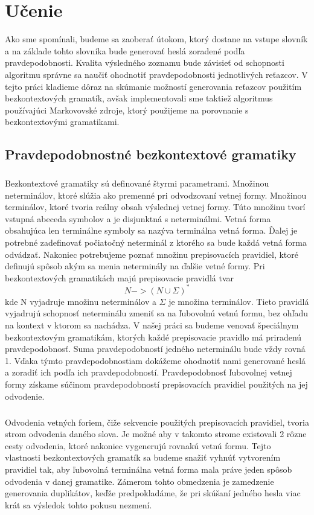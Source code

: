 \chapter{Učenie}
Ako sme spomínali, budeme sa zaoberať útokom, ktorý dostane na vstupe slovník a na základe tohto slovníka bude generovať heslá zoradené podľa pravdepodobnosti. Kvalita výsledného zoznamu bude závisieť od schopnosti algoritmu správne sa naučiť ohodnotiť pravdepodobnosti jednotlivých reťazcov. V tejto práci kladieme dôraz na skúmanie možností generovania reťazcov použitím bezkontextových gramatík, avšak implementovali sme taktiež algoritmus používajúci Markovovské zdroje, ktorý použijeme na porovnanie s bezkontextovými gramatikami.

\section{Pravdepodobnostné bezkontextové gramatiky}
\paragraph{}
Bezkontextové gramatiky sú definované štyrmi parametrami. Množinou neterminálov, ktoré slúžia ako premenné pri odvodzovaní vetnej formy. Množinou terminálov, ktoré tvoria reálny obsah výslednej vetnej formy. Túto množinu tvorí vstupná abeceda symbolov a je disjunktná s neterminálmi. Vetná forma obsahujúca len terminálne symboly sa nazýva terminálna vetná forma. Ďalej je potrebné zadefinovať počiatočný neterminál z ktorého sa bude každá vetná forma odvádzať. Nakoniec potrebujeme poznať množinu prepisovacích pravidiel, ktoré definujú spôsob akým sa menia neterminály na ďalšie vetné formy. Pri bezkontextových gramatikách majú prepisovacie pravidlá tvar
\[N -> (N \cup \Sigma)^*\]
kde N vyjadruje množinu neterminálov a \(\Sigma\) je množina terminálov. Tieto pravidlá vyjadrujú schopnosť neterminálu zmeniť sa na ľubovolnú vetnú formu, bez ohľadu na kontext v ktorom sa nachádza. V našej práci sa budeme venovať špeciálnym bezkontextovým gramatikám, ktorých každé prepisovacie pravidlo má priradenú pravdepodobnosť. Suma pravdepodobností jedného neterminálu bude vždy rovná 1. Vďaka týmto pravdepodobnostiam dokážeme ohodnotiť nami generované heslá a zoradiť ich podľa ich pravdepodobností. Pravdepodobnosť ľubovolnej vetnej formy získame súčinom pravdepodobností prepisovacích pravidiel použitých na jej odvodenie.

\paragraph{}
Odvodenia vetných foriem, čiže sekvencie použitých prepisovacích pravidiel, tvoria strom odvodenia daného slova. Je možné aby v takomto strome existovali 2 rôzne cesty odvodenia, ktoré nakoniec vygenerujú rovnakú vetnú formu. Tejto vlastnosti bezkontextových gramatík sa budeme snažiť vyhnúť vytvorením pravidiel tak, aby ľubovolná terminálna vetná forma mala práve jeden spôsob odvodenia v danej gramatike. Zámerom tohto obmedzenia je zamedzenie generovania duplikátov, keďže predpokladáme, že pri skúšaní jedného hesla viac krát sa výsledok tohto pokusu nezmení.

